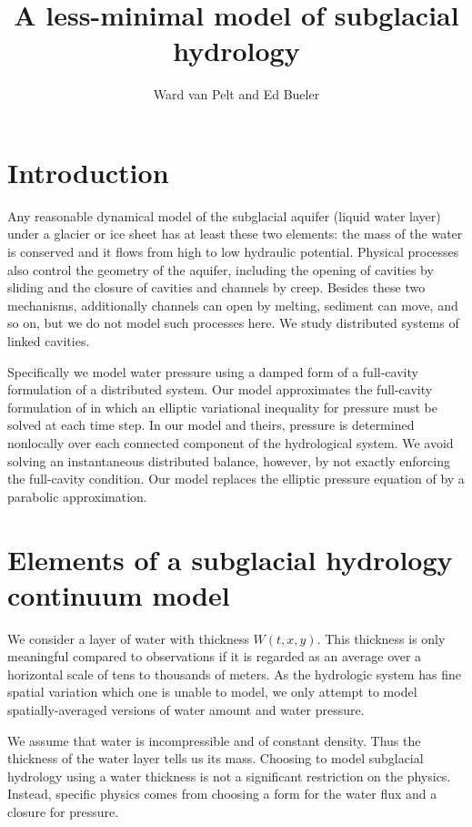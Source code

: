 \documentclass[11pt,final]{amsart}%
\title[]{A less-minimal model of subglacial hydrology}
\author[]{Ward van Pelt and Ed Bueler}
\begin{document}
\maketitle
\thispagestyle{empty}

\section{Introduction}

Any reasonable dynamical model of the subglacial aquifer (liquid water layer) under a glacier or ice sheet has at least these two elements: the mass of the water is conserved and it flows from high to low hydraulic potential.  Physical processes also control the geometry of the aquifer, including the opening of cavities by sliding and the closure of cavities and channels by creep.  Besides these two mechanisms, additionally channels can open by melting, sediment can move, and so on, but we do not model such processes here.  We study distributed systems of linked cavities.

Specifically we model water pressure using a damped form of a full-cavity formulation of a distributed system.  Our model approximates the full-cavity formulation of \cite{Schoofetal2012} in which an elliptic variational inequality for pressure must be solved at each time step.  In our model and theirs, pressure is determined nonlocally over each connected component of the hydrological system.  We avoid solving an instantaneous distributed balance, however, by not exactly enforcing the full-cavity condition.  Our model replaces the elliptic pressure equation of \cite{Schoofetal2012} by a parabolic approximation.


\section{Elements of a subglacial hydrology continuum model}

We consider a layer of water with thickness $W(t,x,y)$.  This thickness is only meaningful compared to observations if it is regarded as an average over a horizontal scale of tens to thousands of meters.  As the hydrologic system has fine spatial variation which one is unable to model, we only attempt to model spatially-averaged versions of water amount and water pressure.

We assume that water is incompressible and of constant density.  Thus the thickness of the water layer tells us its mass.  Choosing to model subglacial hydrology using a water thickness is not a significant restriction on the physics.  Instead, specific physics comes from choosing a form for the water flux and a closure for pressure.
\end{document}
